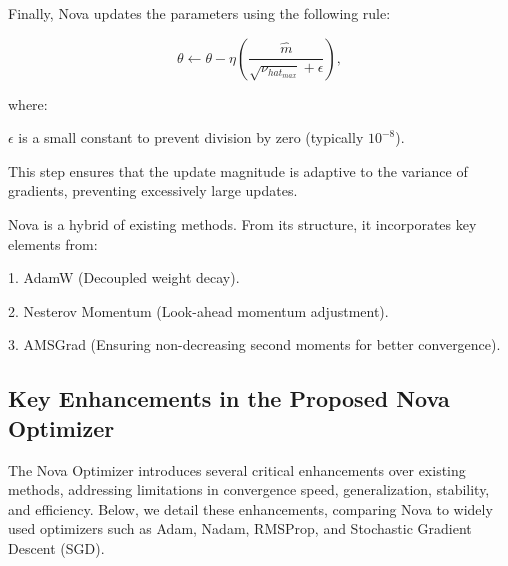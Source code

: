 \documentclass{article}
\begin{document}
\begin{itemize}
Finally, Nova updates the parameters using the following rule:

\begin{equation}
\theta \leftarrow   \theta - \eta(\dfrac{\hat{m}}{\sqrt{\nu_{hat_{max}}}+\epsilon}),
\end{equation}


where:

$\epsilon$ is a small constant to prevent division by zero (typically $10^{-8}$).


This step ensures that the update magnitude is adaptive to the variance of gradients, preventing excessively large updates.


Nova is  a hybrid of existing methods. From its structure, it incorporates key elements from:

1. AdamW (Decoupled weight decay).


2. Nesterov Momentum (Look-ahead momentum adjustment).


3. AMSGrad (Ensuring non-decreasing second moments for better convergence).

\end{itemize}


\subsection{Key Enhancements in the Proposed Nova Optimizer}

The Nova Optimizer introduces several critical enhancements over existing methods, addressing limitations in convergence speed, generalization, stability, and efficiency. Below, we detail these enhancements, comparing Nova to widely used optimizers such as Adam, Nadam, RMSProp, and Stochastic Gradient Descent (SGD).
\end{document}
